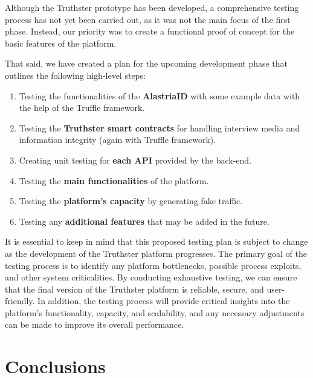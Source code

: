 \documentclass[target=mst,aauheader=]{thud}
\begin{document}
Although the Truthster prototype has been developed, a comprehensive testing process has not yet been carried out, as it was not the main focus of the first phase. Instead, our priority was to create a functional proof of concept for the basic features of the platform.\par
That said, we have created a plan for the upcoming development phase that outlines the following high-level steps:
\begin{enumerate}

    \item Testing the functionalities of the \textbf{AlastriaID} with some example data with the help of the Truffle framework.
    \item Testing the \textbf{Truthster smart contracts} for handling interview media and information integrity (again with Truffle framework).
    \item Creating unit testing for \textbf{each API} provided by the back-end.
    \item Testing the \textbf{main functionalities} of the platform.
    \item Testing the \textbf{platform's capacity} by generating fake traffic.
    \item Testing any \textbf{additional features} that may be added in the future.

\end{enumerate}

It is essential to keep in mind that this proposed testing plan is subject to change as the development of the Truthster platform progresses. The primary goal of the testing process is to identify any platform bottlenecks, possible process exploits, and other system criticalities. By conducting exhaustive testing, we can ensure that the final version of the Truthster platform is reliable, secure, and user-friendly. In addition, the testing process will provide critical insights into the platform's functionality, capacity, and scalability, and any necessary adjustments can be made to improve its overall performance.

\chapter{Conclusions}
\label{chapter:conclusions}
\end{document}
